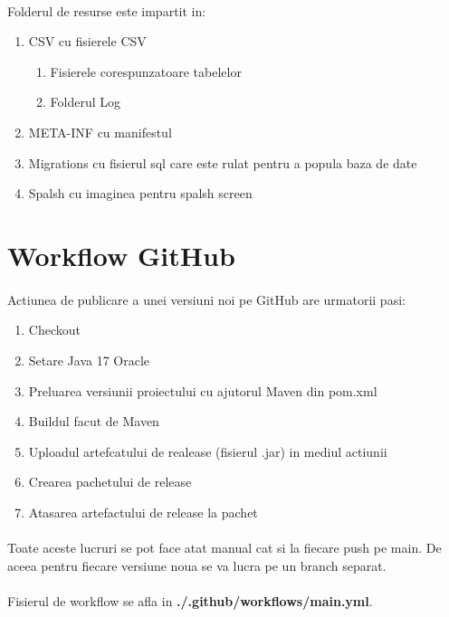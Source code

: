 \documentclass[oneside]{article}
\begin{document}
\paragraph{}Folderul de resurse este impartit in:
\begin{enumerate}
    \item CSV cu fisierele CSV
    \begin{enumerate}
        \item Fisierele corespunzatoare tabelelor
        \item Folderul Log
    \end{enumerate}
    \item META-INF cu manifestul
    \item Migrations cu fisierul sql care este rulat pentru a popula baza de date
    \item Spalsh cu imaginea pentru spalsh screen
\end{enumerate}

\section[Workflow GitHub]{Workflow GitHub}
\paragraph{} Actiunea de publicare a unei versiuni noi pe GitHub are urmatorii pasi:
\begin{enumerate}
    \item Checkout
    \item Setare Java 17 Oracle
    \item Preluarea versiunii proiectului cu ajutorul Maven din pom.xml
    \item Buildul facut de Maven
    \item Uploadul artefcatului de realease (fisierul .jar) in mediul actiunii
    \item Crearea pachetului de release
    \item Atasarea artefactului de release la pachet
\end{enumerate}

\paragraph{} Toate aceste lucruri se pot face atat manual cat si la fiecare push pe main. De aceea pentru fiecare versiune noua se va lucra pe un branch separat.

\paragraph{} Fisierul de workflow se afla in \textbf{./.github/workflows/main.yml}.
\end{document}
